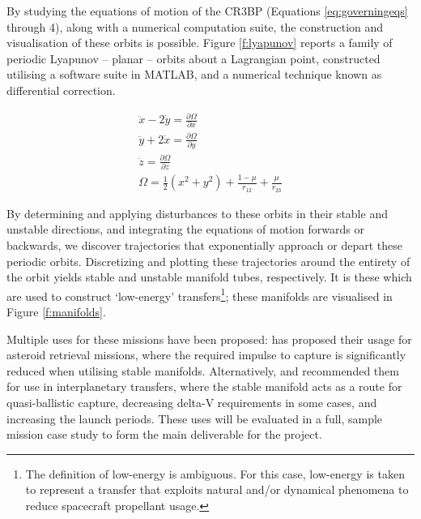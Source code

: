 \documentclass[paper=letter, fontsize=11pt]{article}
\begin{document}
By studying the equations of motion of the CR3BP (Equations \ref{eq:governingeqs} through 4), along with a numerical computation suite, the construction and visualisation of these orbits is possible. Figure \ref{f:lyapunov} reports a family of periodic Lyapunov -- planar -- orbits about a Lagrangian point, constructed utilising a software suite in MATLAB, and a numerical technique known as differential correction.

\begin{align}\label{eq:governingeqs}
\ddot{x} - 2\dot{y} = \frac{\partial \Omega}{\partial x} \\
\ddot{y} + 2\dot{x} = \frac{\partial \Omega}{\partial y} \\
\ddot{z} = \frac{\partial \Omega}{\partial z}\\
\Omega = \frac{1}{2} (x^2 + y^2) + \frac{1 - \mu}{r_{12}} + \frac{\mu}{r_{23}}
\end{align}


By determining and applying disturbances to these orbits in their stable and unstable directions, and integrating the equations of motion forwards or backwards, we discover trajectories that exponentially approach or depart these periodic orbits. Discretizing and plotting these trajectories around the entirety of the orbit yields stable and unstable manifold tubes, respectively. It is these which are used to construct `low-energy' transfers\footnote{The definition of low-energy is ambiguous. For this case, low-energy is taken to represent a transfer that exploits natural and/or dynamical phenomena to reduce spacecraft propellant usage.}; these manifolds are visualised in Figure \ref{f:manifolds}.

Multiple uses for these missions have been proposed: \citep{Sanchez2016} has proposed their usage for asteroid retrieval missions, where the required impulse to capture is significantly reduced when utilising stable manifolds. Alternatively, \citep{Belbruno1993} and \citep{Luo2015} recommended them for use in interplanetary transfers, where the stable manifold acts as a route for quasi-ballistic capture, decreasing delta-V requirements in some cases, and increasing the launch periods. These uses will be evaluated in a full, sample mission case study to form the main deliverable for the project.
\end{document}
